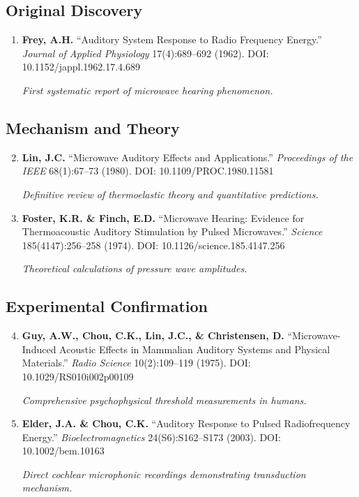 \subsection*{Original Discovery}

\begin{enumerate}
\item \textbf{Frey, A.H.} ``Auditory System Response to Radio Frequency Energy.'' \emph{Journal of Applied Physiology} 17(4):689--692 (1962). DOI: 10.1152/jappl.1962.17.4.689

\textit{First systematic report of microwave hearing phenomenon.}
\end{enumerate}

\subsection*{Mechanism and Theory}

\begin{enumerate}
\setcounter{enumi}{1}
\item \textbf{Lin, J.C.} ``Microwave Auditory Effects and Applications.'' \emph{Proceedings of the IEEE} 68(1):67--73 (1980). DOI: 10.1109/PROC.1980.11581

\textit{Definitive review of thermoelastic theory and quantitative predictions.}

\item \textbf{Foster, K.R. \& Finch, E.D.} ``Microwave Hearing: Evidence for Thermoacoustic Auditory Stimulation by Pulsed Microwaves.'' \emph{Science} 185(4147):256--258 (1974). DOI: 10.1126/science.185.4147.256

\textit{Theoretical calculations of pressure wave amplitudes.}
\end{enumerate}

\subsection*{Experimental Confirmation}

\begin{enumerate}
\setcounter{enumi}{3}
\item \textbf{Guy, A.W., Chou, C.K., Lin, J.C., \& Christensen, D.} ``Microwave-Induced Acoustic Effects in Mammalian Auditory Systems and Physical Materials.'' \emph{Radio Science} 10(2):109--119 (1975). DOI: 10.1029/RS010i002p00109

\textit{Comprehensive psychophysical threshold measurements in humans.}

\item \textbf{Elder, J.A. \& Chou, C.K.} ``Auditory Response to Pulsed Radiofrequency Energy.'' \emph{Bioelectromagnetics} 24(S6):S162--S173 (2003). DOI: 10.1002/bem.10163

\textit{Direct cochlear microphonic recordings demonstrating transduction mechanism.}
\end{enumerate}

